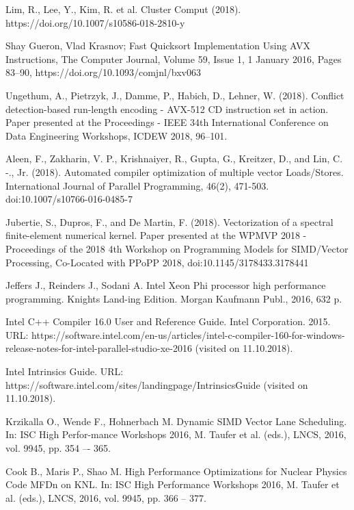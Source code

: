 \documentclass[
11pt,%
tightenlines,%
twoside,%
onecolumn,%
nofloats,%
nobibnotes,%
nofootinbib,%
superscriptaddress,%
noshowpacs,%
centertags]%
{revtex4}
\begin{document}
\begin{thebibliography}{99}
Lim, R., Lee, Y., Kim, R. et al. Cluster Comput (2018). https://doi.org/10.1007/s10586-018-2810-y

Shay Gueron, Vlad Krasnov; Fast Quicksort Implementation Using AVX Instructions, The Computer Journal, Volume 59, Issue 1, 1 January 2016, Pages 83–90, https://doi.org/10.1093/comjnl/bxv063

Ungethum, A., Pietrzyk, J., Damme, P., Habich, D., Lehner, W. (2018). Conflict detection-based run-length encoding - AVX-512 CD instruction set in action. Paper presented at the Proceedings - IEEE 34th International Conference on Data Engineering Workshops, ICDEW 2018, 96--101.

Aleen, F., Zakharin, V. P., Krishnaiyer, R., Gupta, G., Kreitzer, D., and Lin, C. -., Jr. (2018). Automated compiler optimization of multiple vector Loads/Stores. International Journal of Parallel Programming, 46(2), 471-503. doi:10.1007/s10766-016-0485-7

Jubertie, S., Dupros, F., and De Martin, F. (2018). Vectorization of a spectral finite-element numerical kernel. Paper presented at the WPMVP 2018 - Proceedings of the 2018 4th Workshop on Programming Models for SIMD/Vector Processing, Co-Located with PPoPP 2018, doi:10.1145/3178433.3178441

Jeffers J., Reinders J., Sodani A. Intel Xeon Phi processor high performance programming. Knights Land-ing Edition. Morgan Kaufmann Publ., 2016, 632 p.

Intel C++ Compiler 16.0 User and Reference Guide. Intel Corporation. 2015. URL: https://software.intel.com/en-us/articles/intel-c-compiler-160-for-windows-release-notes-for-intel-parallel-studio-xe-2016 (visited on 11.10.2018).

Intel Intrinsics Guide. URL: https://software.intel.com/sites/landingpage/IntrinsicsGuide (visited on 11.10.2018).

Krzikalla O., Wende F., Hohnerbach M. Dynamic SIMD Vector Lane Scheduling. In: ISC High Perfor-mance Workshops 2016, M. Taufer et al. (eds.), LNCS, 2016, vol. 9945, pp. 354 –- 365.

Cook B., Maris P., Shao M. High Performance Optimizations for Nuclear Physics Code MFDn on KNL. In: ISC High Performance Workshops 2016, M. Taufer et al. (eds.), LNCS, 2016, vol. 9945, pp. 366 -- 377.


\end{thebibliography}
\end{document}
